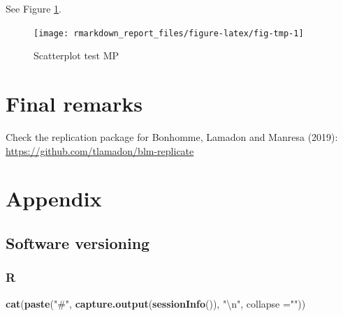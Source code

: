 \documentclass[
  12pt,
]{article}
\newenvironment{Shaded}{\begin{snugshade}}{\end{snugshade}}
\newcommand{\CharTok}[1]{\textcolor[rgb]{0.31,0.60,0.02}{#1}}
\newcommand{\DataTypeTok}[1]{\textcolor[rgb]{0.13,0.29,0.53}{#1}}
\newcommand{\KeywordTok}[1]{\textcolor[rgb]{0.13,0.29,0.53}{\textbf{#1}}}
\newcommand{\NormalTok}[1]{#1}
\newcommand{\StringTok}[1]{\textcolor[rgb]{0.31,0.60,0.02}{#1}}
\begin{document}
See Figure \ref{fig:fig-tmp}.

\begin{figure}[ht]

{\centering \texttt{[image: rmarkdown\_report\_files/figure-latex/fig-tmp-1]} 

}

\caption{Scatterplot test MP}\label{fig:fig-tmp}
\end{figure}

\hypertarget{final-remarks}{%
\section{Final remarks}\label{final-remarks}}

Check the replication package for Bonhomme, Lamadon and Manresa (2019): \url{https://github.com/tlamadon/blm-replicate}

\newpage

\hypertarget{appendix}{%
\section{Appendix}\label{appendix}}

\hypertarget{software-versioning}{%
\subsection{Software versioning}\label{software-versioning}}

\hypertarget{r-1}{%
\subsubsection{R}\label{r-1}}

\begin{Shaded}
\begin{Highlighting}[]
\KeywordTok{cat}\NormalTok{(}\KeywordTok{paste}\NormalTok{(}\StringTok{"#"}\NormalTok{, }\KeywordTok{capture.output}\NormalTok{(}\KeywordTok{sessionInfo}\NormalTok{()), }\StringTok{"}\CharTok{\textbackslash{}n}\StringTok{"}\NormalTok{, }\DataTypeTok{collapse =}\StringTok{""}\NormalTok{))}
\end{Highlighting}
\end{Shaded}
\end{document}
